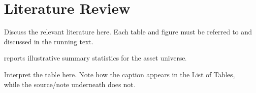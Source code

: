 \chapter{Literature Review}
\label{chap:literature}

Discuss the relevant literature here. Each table and figure must be
referred to and discussed in the running text.

 reports illustrative summary
statistics for the asset universe.



Interpret the table here. Note how the caption appears in the List of
Tables, while the source/note underneath does not.
